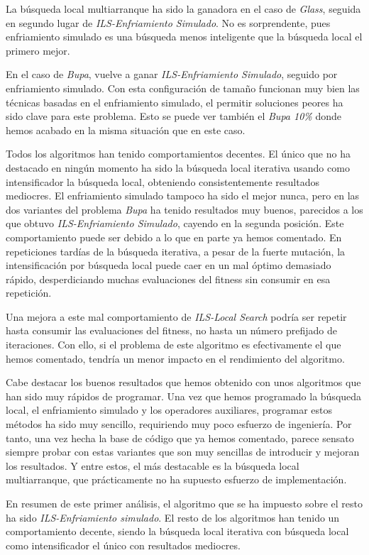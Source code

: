 \documentclass[11pt]{article}
\begin{document}
La búsqueda local multiarranque ha sido la ganadora en el caso de \emph{Glass}, seguida en segundo lugar de \emph{ILS-Enfriamiento Simulado}. No es sorprendente, pues enfriamiento simulado es una búsqueda menos inteligente que la búsqueda local el primero mejor.

En el caso de \emph{Bupa}, vuelve a ganar \emph{ILS-Enfriamiento Simulado}, seguido por enfriamiento simulado. Con esta configuración de tamaño funcionan muy bien las técnicas basadas en el enfriamiento simulado, el permitir soluciones peores ha sido clave para este problema. Esto se puede ver también el \emph{Bupa 10\%} donde hemos acabado en la misma situación que en este caso.

Todos los algoritmos han tenido comportamientos decentes. El único que no ha destacado en ningún momento ha sido la búsqueda local iterativa usando como intensificador la búsqueda local, obteniendo consistentemente resultados mediocres. El enfriamiento simulado tampoco ha sido el mejor nunca, pero en las dos variantes del problema \emph{Bupa} ha tenido resultados muy buenos, parecidos a los que obtuvo \emph{ILS-Enfriamiento Simulado}, cayendo en la segunda posición. Este comportamiento puede ser debido a lo que en parte ya hemos comentado. En repeticiones tardías de la búsqueda iterativa, a pesar de la fuerte mutación, la intensificación por búsqueda local puede caer en un mal óptimo demasiado rápido, desperdiciando muchas evaluaciones del fitness sin consumir en esa repetición.

Una mejora a este mal comportamiento de \emph{ILS-Local Search} podría ser repetir hasta consumir las evaluaciones del fitness, no hasta un número prefijado de iteraciones. Con ello, si el problema de este algoritmo es efectivamente el que hemos comentado, tendría un menor impacto en el rendimiento del algoritmo.

Cabe destacar los buenos resultados que hemos obtenido con unos algoritmos que han sido muy rápidos de programar. Una vez que hemos programado la búsqueda local, el enfriamiento simulado y los operadores auxiliares, programar estos métodos ha sido muy sencillo, requiriendo muy poco esfuerzo de ingeniería. Por tanto, una vez hecha la base de código que ya hemos comentado, parece sensato siempre probar con estas variantes que son muy sencillas de introducir y mejoran los resultados. Y entre estos, el más destacable es la búsqueda local multiarranque, que prácticamente no ha supuesto esfuerzo de implementación.

En resumen de este primer análisis, el algoritmo que se ha impuesto sobre el resto ha sido \emph{ILS-Enfriamiento simulado}. El resto de los algoritmos han tenido un comportamiento decente, siendo la búsqueda local iterativa con búsqueda local como intensificador el único con resultados mediocres.
\end{document}
